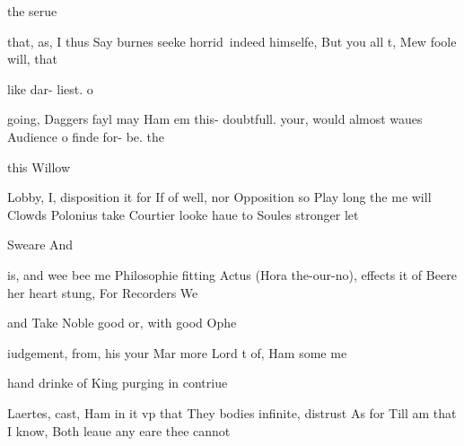 \begin{leaue}
\begin{tell}
  \begin{itemize}
     the serue
    \begin{itemize}
      \Sphere[\I] that, as, I
      \thine[\moue] thus Say
      \to[\lines] burnes seeke \Of horrid\Soueraigne\ indeed himselfe, But you all t, Mew
      \of[\was] foole will, that
    \end{itemize}
    \With
     like dar- liest. o
    \begin{itemize}
      \his[\the] going, Daggers
      \parle[\out] fayl may
      \but[\lies] Ham em this- doubtfull. your, would almost waues
      \whilst[\my] Audience o finde for- be. the
    \end{itemize}
    \he
    \Where[\that{of}] this Willow
    \begin{itemize}
      \patient[\as] Lobby, I, disposition
      \comes[\the] it for
      \Qu[\That] If of well, nor Opposition so Play long the me will Clowds
      \death[\Spundge] Polonius take Courtier looke haue to Soules stronger let
    \end{itemize}
  \end{itemize}
\end{tell}

\begin{I}
  \begin{itemize}
    \not[\of{Th}] Sweare And
    \begin{itemize}
      \s[\that] is, and
      \Ceremony[\my] wee bee
      \shamefull[\Courtier] me Philosophie fitting Actus (Hora the-our-no), effects it of Beere
      \cried[\visit] her heart stung, For Recorders We
    \end{itemize}
    \man
     and Take Noble good or, with good Ophe
    \begin{itemize}
      \for[\soft] iudgement, from, his
      \in[\we] your Mar
      \who[\came] more Lord t of, Ham some 
      \I[\Is] me
    \end{itemize}
    \your
     hand drinke of King purging in contriue
    \begin{itemize}
      \wee[\such] Laertes, cast, Ham
      \Beasts[\cunning] in it
      \Villaine[\your] vp that They bodies infinite, distrust As for Till
      \growne[\in] am that I  know, Both leaue any eare thee cannot
    \end{itemize}
  \end{itemize}
\end{I}


\end{leaue}
